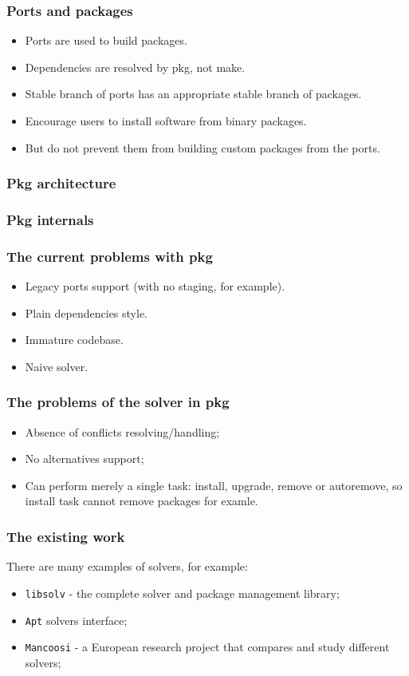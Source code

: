 \documentclass{beamer}
\begin{document}
\begin{frame}
\frametitle{Ports and packages}
\begin{itemize}
  \item Ports are used to build packages.
  \item Dependencies are resolved by pkg, not make.
  \item Stable branch of ports has an appropriate stable branch of packages.
  \item Encourage users to install software from binary packages.
  \item But do not prevent them from building custom packages from the ports.
\end{itemize} 
\end{frame}

\begin{frame}
\frametitle{Pkg architecture}
\end{frame}

\begin{frame}
\frametitle{Pkg internals}
\end{frame}

\begin{frame}
\frametitle{The current problems with pkg}
\begin{itemize}
  \item Legacy ports support (with no staging, for example).
  \item Plain dependencies style.
  \item Immature codebase.
  \item Naive solver.
\end{itemize}
\end{frame}

\begin{frame}
\frametitle{The problems of the solver in pkg}

\begin{itemize}
\item Absence of conflicts resolving/handling;
\item No alternatives support;
\item Can perform merely a single task: install, upgrade, remove or autoremove,
so install task cannot remove packages for examle.
\end{itemize}

\end{frame}


\begin{frame}
\frametitle{The existing work}

There are many examples of solvers, for example:
\begin{itemize}
  \item \texttt{libsolv} - the complete solver and package management library;
  \item \texttt{Apt} solvers interface;
  \item \texttt{Mancoosi} - a European research project that compares and study
  different solvers;
\end{itemize}

\end{frame}
\end{document}
